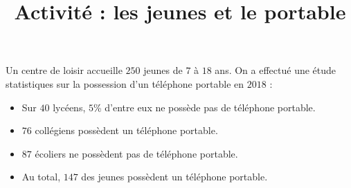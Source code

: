 \documentclass[
	classe=$2^{de}$
]{exercice}
\title{Activité : les jeunes et le portable}
\begin{document}
\maketitle

\begin{tcolorbox}
	Un centre de loisir accueille $250$ jeunes de $7$ à $18$ ans. On a effectué une étude statistiques sur la possession d'un téléphone portable en $2018$ :
	\begin{itemize}
		\item Sur $40$ lycéens, $5$\% d'entre eux ne possède pas de téléphone portable.
		\item $76$ collégiens possèdent un téléphone portable.
		\item $87$ écoliers ne possèdent pas de téléphone portable.
		\item Au total, $147$ des jeunes possèdent un téléphone portable.
	\end{itemize}
\end{tcolorbox}
\end{document}
